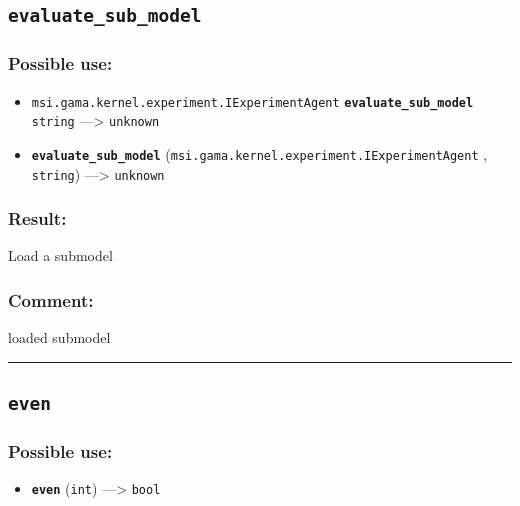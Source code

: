 \documentclass[]{book}
\providecommand{\tightlist}{%
  \setlength{\itemsep}{0pt}\setlength{\parskip}{0pt}}
\theoremstyle{definition}
\theoremstyle{definition}
\theoremstyle{definition}
\theoremstyle{remark}
\begin{document}
\subsection{\texorpdfstring{\texttt{evaluate\_sub\_model}}{evaluate\_sub\_model}}\label{evaluate_sub_model}

\subsubsection{Possible use:}\label{possible-use-156}

\begin{itemize}
\tightlist
\item
  \texttt{msi.gama.kernel.experiment.IExperimentAgent}
  \textbf{\texttt{evaluate\_sub\_model}} \texttt{string}
  ---\textgreater{} \texttt{unknown}
\item
  \textbf{\texttt{evaluate\_sub\_model}}
  (\texttt{msi.gama.kernel.experiment.IExperimentAgent} ,
  \texttt{string}) ---\textgreater{} \texttt{unknown}
\end{itemize}

\subsubsection{Result:}\label{result-150}

Load a submodel

\subsubsection{Comment:}\label{comment-33}

loaded submodel

\begin{center}\rule{0.5\linewidth}{\linethickness}\end{center}

\subsection{\texorpdfstring{\texttt{even}}{even}}\label{even}

\subsubsection{Possible use:}\label{possible-use-157}

\begin{itemize}
\tightlist
\item
  \textbf{\texttt{even}} (\texttt{int}) ---\textgreater{} \texttt{bool}
\end{itemize}
\end{document}

